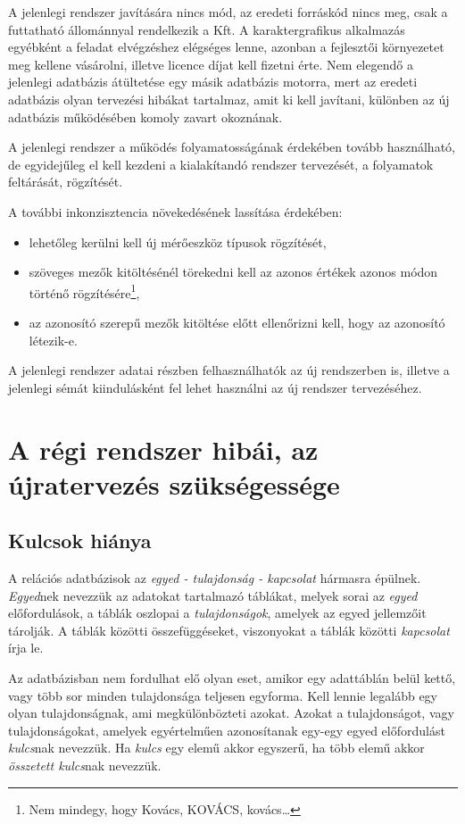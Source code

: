 \documentclass[a4paper,12pt]{report}
\begin{document}
A jelenlegi rendszer javítására nincs mód, az eredeti forráskód nincs meg, csak
a futtatható állománnyal rendelkezik a Kft. 
A karaktergrafikus alkalmazás egyébként a feladat elvégzéshez elégséges lenne, 
azonban a fejlesztői környezetet meg kellene vásárolni, illetve licence díjat 
kell fizetni érte.
Nem elegendő a jelenlegi adatbázis átültetése egy másik adatbázis motorra, mert
az eredeti adatbázis olyan tervezési hibákat tartalmaz, amit ki kell javítani, 
különben az új adatbázis működésében komoly zavart okoznának.

A jelenlegi rendszer a működés folyamatosságának érdekében tovább használható, 
de egyidejűleg el kell kezdeni a kialakítandó rendszer tervezését, a folyamatok 
feltárását, rögzítését.

A további inkonzisztencia növekedésének lassítása érdekében:
\begin{itemize}
\item lehetőleg kerülni kell új mérőeszköz típusok rögzítését,
\item  szöveges mezők kitöltésénél törekedni kell az azonos értékek azonos módon
történő rögzítésére\footnote{Nem mindegy, hogy Kovács, KOVÁCS, kovács\dots},
\item az azonosító szerepű mezők kitöltése előtt ellenőrizni kell, hogy az 
azonosító létezik-e.
\end{itemize}

A jelenlegi rendszer adatai részben felhasználhatók az új rendszerben is, 
illetve a jelenlegi sémát kiindulásként fel lehet használni az új rendszer 
tervezéséhez.

\section{A régi rendszer hibái, az újratervezés szükségessége}

\subsection{Kulcsok hiánya}
A relációs adatbázisok az \textit{egyed - tulajdonság - kapcsolat} hármasra
épülnek. \textit{Egyed}nek nevezzük az adatokat tartalmazó táblákat, melyek 
sorai az \textit{egyed} előfordulások, a táblák oszlopai a 
\textit{tulajdonságok}, amelyek az egyed jellemzőit tárolják. A táblák 
közötti összefüggéseket, viszonyokat a táblák közötti \textit{kapcsolat} írja 
le.

Az adatbázisban nem fordulhat elő olyan eset, amikor egy adattáblán belül kettő, vagy több sor minden tulajdonsága teljesen egyforma. Kell lennie legalább egy olyan tulajdonságnak, ami megkülönbözteti azokat.
Azokat a tulajdonságot, vagy tulajdonságokat, amelyek egyértelműen azonosítanak
egy-egy egyed előfordulást \textit{kulcs}nak nevezzük. Ha \textit{kulcs} egy 
elemű akkor egyszerű, ha több elemű akkor \textit{összetett kulcs}nak nevezzük.
\end{document}
